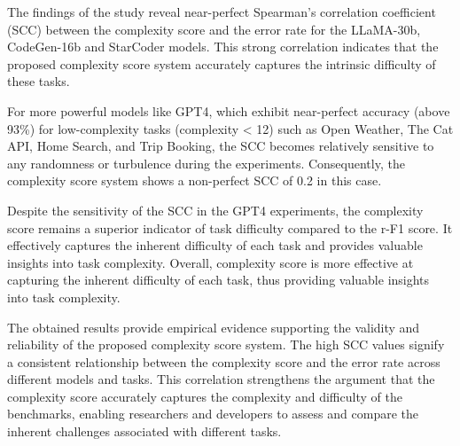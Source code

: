 The findings of the study reveal near-perfect Spearman's correlation coefficient (SCC) between the complexity score and the error rate for the LLaMA-30b, CodeGen-16b and StarCoder models. This strong correlation indicates that the proposed complexity score system accurately captures the intrinsic difficulty of these tasks.

For more powerful models like GPT4, which exhibit near-perfect accuracy (above 93\%) for low-complexity tasks (complexity < 12) such as Open Weather, The Cat API, Home Search, and Trip Booking, the SCC becomes relatively sensitive to any randomness or turbulence during the experiments. Consequently, the complexity score system shows a non-perfect SCC of 0.2 in this case.

Despite the sensitivity of the SCC in the GPT4 experiments, the complexity score remains a superior indicator of task difficulty compared to the r-F1 score. It effectively captures the inherent difficulty of each task and provides valuable insights into task complexity. Overall, complexity score is more effective at capturing the inherent difficulty of each task, thus providing valuable insights into task complexity.

The obtained results provide empirical evidence supporting the validity and reliability of the proposed complexity score system. The high SCC values signify a consistent relationship between the complexity score and the error rate across different models and tasks. This correlation strengthens the argument that the complexity score accurately captures the complexity and difficulty of the benchmarks, enabling researchers and developers to assess and compare the inherent challenges associated with different tasks.













